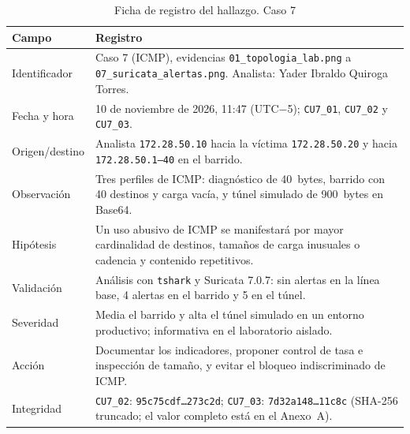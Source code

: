 \begin{table}[H]
	\centering
	\caption{Ficha de registro del hallazgo. Caso 7}
	\footnotesize
	\renewcommand{\arraystretch}{1.2}
	\begin{tabularx}{\textwidth}{@{}>{\raggedright\arraybackslash}p{} Y@{}}
		\toprule
		\textbf{Campo} & \textbf{Registro} \\ \midrule
		Identificador & Caso 7 (ICMP), evidencias \texttt{01\_topologia\_lab.png} a \texttt{07\_suricata\_alertas.png}. Analista: Yader Ibraldo Quiroga Torres. \\ \hline
		Fecha y hora & 10 de noviembre de 2026, 11:47 (UTC$-$5); \texttt{CU7\_01}, \texttt{CU7\_02} y \texttt{CU7\_03}. \\ \hline
		Origen/destino & Analista \texttt{172.28.50.10} hacia la víctima \texttt{172.28.50.20} y hacia \texttt{172.28.50.1--40} en el barrido. \\ \hline
		Observación & Tres perfiles de ICMP: diagnóstico de 40~bytes, barrido con 40 destinos y carga vacía, y túnel simulado de 900~bytes en Base64. \\ \hline
		Hipótesis & Un uso abusivo de ICMP se manifestará por mayor cardinalidad de destinos, tamaños de carga inusuales o cadencia y contenido repetitivos. \\ \hline
		Validación & Análisis con \texttt{tshark} y Suricata 7.0.7: sin alertas en la línea base, 4 alertas en el barrido y 5 en el túnel. \\ \hline
		Severidad & Media el barrido y alta el túnel simulado en un entorno productivo; informativa en el laboratorio aislado. \\ \hline
		Acción & Documentar los indicadores, proponer control de tasa e inspección de tamaño, y evitar el bloqueo indiscriminado de ICMP. \\ \hline
		Integridad & \texttt{CU7\_02}: \texttt{95c75cdf\dots273c2d}; \texttt{CU7\_03}: \texttt{7d32a148\dots11c8c} (SHA-256 truncado; el valor completo está en el Anexo~A). \\
		\bottomrule
	\end{tabularx}
\end{table}

